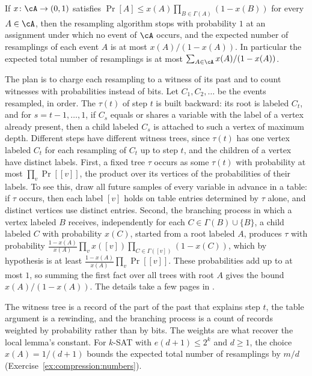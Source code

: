 \begin{refsection}
\begin{theorem}\label{thm:compression:mt}
If $x\colon\cA\to(0,1)$ satisfies $\Pr[A]\le x(A)\prod_{B\in\Gamma(A)}(1-x(B))$ for every $A\in\cA$, then the resampling algorithm stops with probability $1$ at an assignment under which no event of $\cA$ occurs, and the expected number of resamplings of each event $A$ is at most $x(A)/(1-x(A))$. In particular the expected total number of resamplings is at most $\sum_{A\in\cA}x(A)/(1-x(A))$.
\end{theorem}

\begin{proofsketch}
The plan is to charge each resampling to a witness of its past and to count witnesses with probabilities instead of bits. Let $C_1,C_2,\dots$ be the events resampled, in order. The  $\tau(t)$ of step $t$ is built backward: its root is labeled $C_t$, and for $s=t-1,\dots,1$, if $C_s$ equals or shares a variable with the label of a vertex already present, then a child labeled $C_s$ is attached to such a vertex of maximum depth. Different steps have different witness trees, since $\tau(t)$ has one vertex labeled $C_t$ for each resampling of $C_t$ up to step $t$, and the children of a vertex have distinct labels. First, a fixed tree $\tau$ occurs as some $\tau(t)$ with probability at most $\prod_v\Pr[[v]]$, the product over its vertices of the probabilities of their labels. To see this, draw all future samples of every variable in advance in a table: if $\tau$ occurs, then each label $[v]$ holds on table entries determined by $\tau$ alone, and distinct vertices use distinct entries. Second, the branching process in which a vertex labeled $B$ receives, independently for each $C\in\Gamma(B)\cup\{B\}$, a child labeled $C$ with probability $x(C)$, started from a root labeled $A$, produces $\tau$ with probability $\frac{1-x(A)}{x(A)}\prod_v x([v])\prod_{C\in\Gamma([v])}(1-x(C))$, which by hypothesis is at least $\frac{1-x(A)}{x(A)}\prod_v\Pr[[v]]$. These probabilities add up to at most $1$, so summing the first fact over all trees with root $A$ gives the bound $x(A)/(1-x(A))$. The details take a few pages in \textcite{MoserTardos2010}.
\end{proofsketch}

The witness tree is a record of the part of the past that explains step $t$, the table argument is a rewinding, and the branching process is a count of records weighted by probability rather than by bits. The weights are what recover the local lemma's constant. For $k$-SAT with $e(d+1)\le2^k$ and $d\ge1$, the choice $x(A)=1/(d+1)$ bounds the expected total number of resamplings by $m/d$ (Exercise~\ref{ex:compression:numbers}).


\end{refsection}
